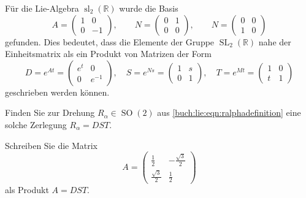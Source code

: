 Für die Lie-Algebra $\operatorname{sl}_2(\mathbb{R})$ wurde die Basis
\[
A=\begin{pmatrix} 1&0\\0&-1 \end{pmatrix},
\qquad
N=\begin{pmatrix} 0&1\\0&0\end{pmatrix},
\qquad
N=\begin{pmatrix} 0&0\\1&0\end{pmatrix}
\]
gefunden.
Dies bedeutet, dass die Elemente
der Gruppe $\operatorname{SL}_2(\mathbb{R})$ nahe der Einheitsmatrix
als ein Produkt von Matrizen der Form
\[
D=e^{At}=\begin{pmatrix}e^t&0\\0&e^{-1}\end{pmatrix},
\quad
S=e^{Ns} = \begin{pmatrix}1&s\\0&1\end{pmatrix},
\quad
T=e^{Mt} = \begin{pmatrix}1&0\\t&1\end{pmatrix}
\]
geschrieben werden können.
\begin{teilaufgaben}
\item
Finden Sie zur Drehung $R_\alpha\in\operatorname{SO}(2)$
aus \eqref{buch:lie:eqn:ralphadefinition} eine solche Zerlegung
$R_\alpha=DST$.
\item
Schreiben Sie die Matrix
\[
A=\begin{pmatrix}
\frac12&-\frac{\sqrt{3}}2\\
\frac{\sqrt{3}}2&\frac12
\end{pmatrix}
\]
als Produkt $A=DST$.
\end{teilaufgaben}

